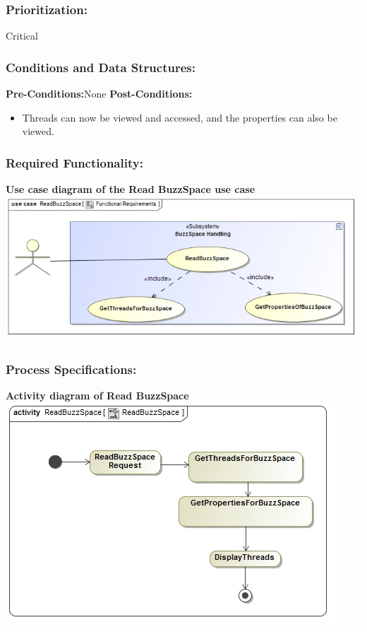 \documentclass[a4paper,11pt]{article}
\begin{document}
\subsubsection{Prioritization:} Critical
\subsubsection{Conditions and Data Structures:}
\textbf{Pre-Conditions:}None 
\textbf{Post-Conditions:}
\begin{itemize}
	\item Threads can now be viewed and accessed, and the properties can also be viewed.
\end{itemize}
\subsubsection{Required Functionality:} 
\textbf{Use case diagram of the Read BuzzSpace use case}\\ 
\includegraphics[width=1\linewidth]{./Images/BuzzSpaceHandling/buzzSpaceRead.jpg}\\
\subsubsection{Process Specifications:} 
\textbf{Activity diagram of Read BuzzSpace}\\ 
\includegraphics[width=1\linewidth]{./Images/BuzzSpaceHandling/buzzSpaceReadAct.jpg}\\
\end{document}
